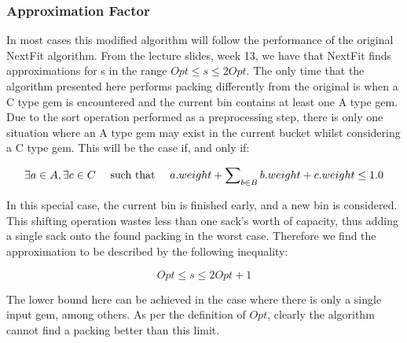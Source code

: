\documentclass[paper=a4, fontsize=12pt]{article}
\begin{document}
\subsubsection{Approximation Factor}
In most cases this modified algorithm will follow the performance of the
original NextFit algorithm. From the lecture slides, week 13, we have that
NextFit finds approximations for s in the range \(Opt \leq s \leq 2 Opt\). The
only time that the algorithm presented here performs packing differently from
the original is when a C type gem is encountered and the current bin contains
at least one A type gem. Due to the sort operation performed as a preprocessing
step, there is only one situation where an A type gem may exist in the current
bucket whilst considering a C type gem. This will be the case if, and only if:

\begin{displaymath}
\exists a \in A, \exists c \in C \text{ \quad such that \quad } a.weight + \sum\nolimits_{b \in B} b.weight + c.weight \leq 1.0
\end{displaymath}

In this special case, the current bin is finished early, and a new bin is
considered. This shifting operation wastes less than one sack's worth of
capacity, thus adding a single sack onto the found packing in the worst
case. Therefore we find the approximation to be described by the following
inequality:

\begin{displaymath}
Opt \leq s \leq 2 Opt + 1
\end{displaymath}

The lower bound here can be achieved in the case where there is only a single input gem, among others. As per the definition of \(Opt\), clearly the algorithm cannot find a packing better than this limit.
\end{document}
